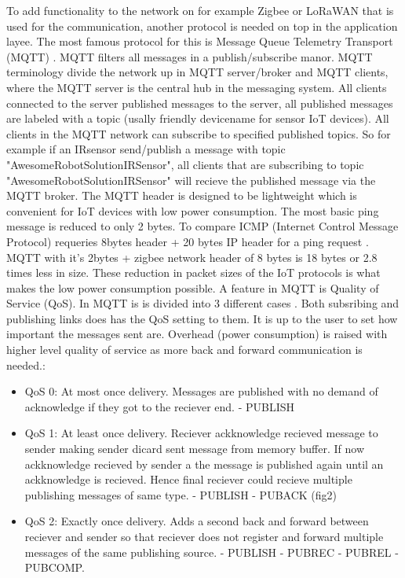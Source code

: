 \documentclass[article,a4paper]{IEEEtran}
\begin{document}
    To add functionality to the network on for example Zigbee or LoRaWAN that is used for the communication, another protocol is needed on top in the application layee. The most famous protocol for this is Message Queue Telemetry Transport (MQTT) \cite{mqtt3.1.1,mqtt5.0}. MQTT filters all messages in a publish/subscribe manor. MQTT terminology divide the network up in MQTT server/broker and MQTT clients, where the MQTT server is the central hub in the messaging system. All clients connected to the server published messages to the server, all published messages are labeled with a topic (usally friendly devicename for sensor IoT devices). All clients in the MQTT network can subscribe to specified published topics. So for example if an IRsensor send/publish a message with topic "AwesomeRobotSolutionIRSensor", all clients that are subscribing to topic "AwesomeRobotSolutionIRSensor" will recieve the published message via the MQTT broker. The MQTT header is designed to be lightweight which is convenient for IoT devices with low power consumption. The most basic ping message is reduced to only 2 bytes. To compare ICMP (Internet Control Message Protocol) requeries 8bytes header + 20 bytes IP header for a ping request \cite{ICMPping}. MQTT with it's 2bytes + zigbee network header of 8 bytes is 18 bytes or 2.8 times less in size. These reduction in packet sizes of the IoT protocols is what makes the low power consumption possible.
    \newline\newline
    A feature in MQTT is Quality of Service (QoS). In MQTT is is divided into 3 different cases \cite{mqtt3.1.1,mqtt5.0}. Both subsribing and publishing links does has the QoS setting to them. It is up to the user to set how important the messages sent are. Overhead (power consumption) is raised with higher level quality of service as more back and forward communication is needed.:
    \begin{itemize}
        \item QoS 0: At most once delivery. Messages are published with no demand of acknowledge if they got to the reciever end. - PUBLISH
        \item QoS 1: At least once delivery. Reciever ackknowledge recieved message to sender making sender dicard sent message from memory buffer. If now ackknowledge recieved by sender a the message is published again until an ackknowledge is recieved. Hence final reciever could recieve multiple publishing messages of same type. - PUBLISH - PUBACK (fig2)
        \item QoS 2: Exactly once delivery. Adds a second back and forward between reciever and sender so that reciever does not register and forward multiple messages of the same publishing source. - PUBLISH - PUBREC - PUBREL - PUBCOMP.  
    \end{itemize}
\end{document}

